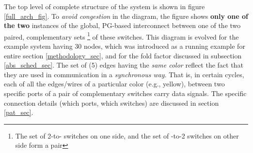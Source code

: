\documentclass[12pt]{article}
\begin{document}
The top level of complete
structure of the system is shown in figure \ref{full_arch_fig}. To
\textit{avoid congestion} in the diagram, the figure shows \textbf{only one
of the two} instances of the global, PG-based interconnect between
one of the two paired,
complementary sets \footnote{The set of 2-to-
switches on one side, and the set of
-to-2 switches on other side form a pair}
of these switches. This diagram is evolved for the
example system having 30 nodes, which was introduced as a running example
for entire section \ref{methodology_sec}, and for the fold factor discussed
in subsection \ref{abs_sched_sec}. The set of (5) edges having the
\textit{same color} reflect the fact that they are used in communication in
a \textit{synchronous way}. That is, in certain cycles, each of all the
edges/wires of a particular color (e.g., yellow), between two specific
ports of a pair of complementary switches carry data signals. The specific
connection details (which ports, which switches) are discussed in section
\ref{pat_sec}.
\end{document}
